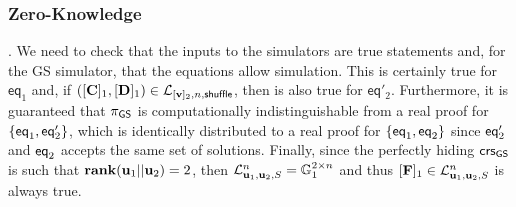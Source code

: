 \subsubsection{Zero-Knowledge}. We need to check that the inputs to the simulators are true statements and, for the GS simulator, that the equations allow simulation. This is certainly true for $\mathsf{eq}_1$ and, if $([\mathbf{{C}}]_1,[\mathbf{{D}}]_1)\in\mathcal{L}_{[\mathbf{v}]_2,n,\mathsf{shuffle}}$, then is also true for $\mathsf{eq}'_2$. Furthermore, it is guaranteed that $\pi_{\mathsf{GS}}$ is computationally indistinguishable from a real proof for $\{\mathsf{eq}_1,\mathsf{eq}'_2\}$, which is identically distributed to a real proof for $\{\mathsf{eq}_1,\mathsf{eq}_2\}$ since $\mathsf{eq}'_2$ and $\mathsf{eq}_2$ accepts the same set of solutions.
Finally, since the perfectly hiding $\mathsf{crs}_{\mathsf{GS}}$ is such that $\mathbf{rank}(\mathbf{u}_1||\mathbf{u}_2)=2$, then $\mathcal{L}_{\mathbf{u}_1,\mathbf{u}_2,S}^n=\mathbb{G}_1^{2\times n}$ and thus $[\mathbf{{F}}]_1\in\mathcal{L}_{\mathbf{u}_1,\mathbf{u}_2,S}^n$ is always true.
